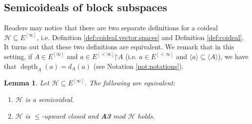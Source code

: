 \documentclass[11pt,reqno]{amsart}
\theoremstyle{plain}
\numberwithin{equation}{section}
\newtheorem{lemma}[theorem]{Lemma}
\theoremstyle{definition}
\newcommand{\func}{\operatorname}
\renewcommand{\c}[1]{\langle #1 \rangle}
\newcommand{\cal}{\mathcal}
\newcommand{\restrictedto}{\mathord{\upharpoonright}}
\renewcommand{\H}{\cal{H}}
\newcommand{\depth}{\func{depth}}
\begin{document}
\subsection{Semicoideals of block subspaces}
Readers may notice that there are two separate definitions for a coideal $\H \subseteq E^{[\infty]}$, i.e. Definition \ref{def:coideal.vector.spaces} and Definition \ref{def:coideal}. It turns out that these two definitions are equivalent. We remark that in this setting, if $A \in E^{[\infty]}$ and $a \in E^{[<\infty]}\restrictedto A$ (i.e. $a \in E^{[<\infty]}$ and $\c{a} \subseteq \c{A}$), we have that $\depth_A(a) = d_A(a)$ (see Notation \ref{not:notations}).

\begin{lemma}
    Let $\H \subseteq E^{[\infty]}$. The following are equivalent:
    \begin{enumerate}
        \item $\H$ is a semicoideal.
        
        \item $\H$ is $\leq$-upward closed and \textbf{A3} mod $\H$ holds.
    \end{enumerate}
\end{lemma}
\end{document}
